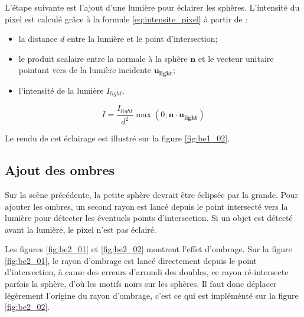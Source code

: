 \documentclass[12pt,a4paper,twoside]{report}
\begin{document}
L'étape suivante est l'ajout d'une lumière pour éclairer les sphères. L'intensité du pixel est calculé grâce à la formule \eqref{eq:intensite_pixel} à partir de :
\begin{itemize}
	\item la distance $d$ entre la lumière et le point d'intersection;
	\item le produit scalaire entre la normale à la sphère $\mathbf{n}$ et le vecteur unitaire pointant vers de la lumière incidente $\mathbf{u_{light}}$;
	\item l'intensité de la lumière $I_{light}$.
\end{itemize}

\begin{equation}
	\label{eq:intensite_pixel}
	I = \frac{I_{light}}{d^2}\max\left(0, \mathbf n \cdot \mathbf{u_{light}}\right)
\end{equation}

Le rendu de cet éclairage est illustré sur la figure \ref{fig:be1_02}.

\subsection{Ajout des ombres}

Sur la scène précédente, la petite sphère devrait être éclipsée par la grande. Pour ajouter les ombres, un second rayon est lancé depuis le point intersecté vers la lumière pour détecter les éventuels points d'intersection. Si un objet est détecté avant la lumière, le pixel n'est pas éclairé.

Les figures \ref{fig:be2_01} et \ref{fig:be2_02} montrent l'effet d'ombrage. Sur la figure \ref{fig:be2_01}, le rayon d'ombrage est lancé directement depuis le point d'intersection, à cause des erreurs d'arrondi des doubles, ce rayon ré-intersecte parfois la sphère, d'où les motifs noirs sur les sphères. Il faut donc déplacer légèrement l'origine du rayon d'ombrage, c'est ce qui est impléménté sur la figure \ref{fig:be2_02}.
\end{document}
